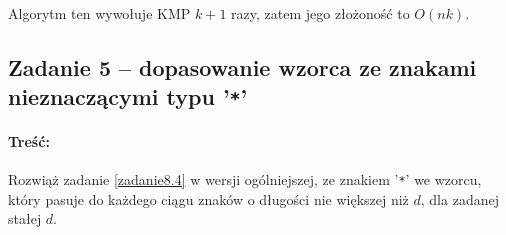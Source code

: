 Algorytm ten wywołuje KMP $k+1$ razy, zatem jego złożoność to $O(nk)$.

\subsection{Zadanie 5 -- dopasowanie wzorca ze znakami nieznaczącymi typu '\texttt{*}'}
\paragraph{Treść:}
Rozwiąż zadanie \ref{zadanie8.4} w wersji ogólniejszej, ze znakiem '\texttt{*}' we wzorcu, który pasuje do każdego ciągu znaków o długości nie większej niż $d$, dla zadanej stałej $d$.
